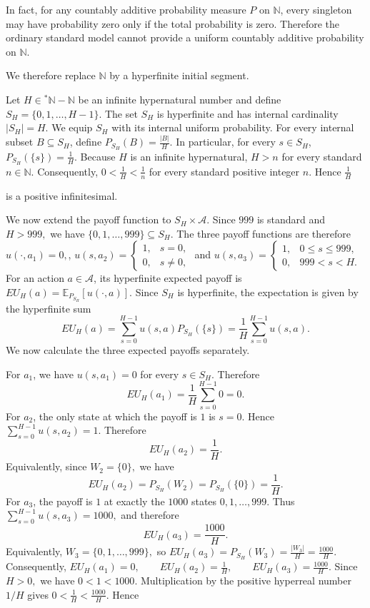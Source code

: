 \documentclass[10pt,a4paper]{book}
\begin{document}
In fact, for any countably additive probability measure $P$ on $\mathbb N$, every singleton may have probability zero only if the total probability is zero. Therefore the ordinary standard model cannot provide a uniform countably additive probability on $\mathbb N$.

We therefore replace $\mathbb N$ by a hyperfinite initial segment.

Let
$
    H\in{}^*\mathbb N-\mathbb N
$
be an infinite hypernatural number and define
$
    S_H=\{0,1,\ldots,H-1\}.
$
The set $S_H$ is hyperfinite and has internal cardinality
$
    |S_H|=H.
$
We equip $S_H$ with its internal uniform probability. For every internal subset $B\subseteq S_H$, define
$
    P_{S_H}(B)=\frac{|B|}{H}.
$
In particular, for every $s\in S_H$,
$
    P_{S_H}(\{s\})
    =
    \frac{1}{H}.
$
Because $H$ is an infinite hypernatural,
$
    H>n
$
for every standard $n\in\mathbb N$. Consequently,
$
    0<\frac1H<\frac1n
$
for every standard positive integer $n$. Hence
$
    \frac1H
$

is a positive infinitesimal.

We now extend the payoff function to $S_H\times\mathcal A$. Since $999$ is standard and
$
    H>999,
$
we have
$
    \{0,1,\ldots,999\}\subseteq S_H.
$
The three payoff functions are therefore
$
    u(\cdot,a_1)=0,
$,
$
    u(s,a_2)=
    \begin{cases}
        1, & s=0,    \\
        0, & s\neq0,
    \end{cases}
$
and
$
    u(s,a_3)=
    \begin{cases}
        1, & 0\leq s\leq999, \\
        0, & 999<s<H.
    \end{cases}
$
For an action $a\in\mathcal A$, its hyperfinite expected payoff is
$
    EU_H(a)
    =
    \mathbb E_{P_{S_H}}[u(\cdot,a)].
$
Since $S_H$ is hyperfinite, the expectation is given by the hyperfinite sum
$$
    EU_H(a)
    =
    \sum_{s=0}^{H-1}u(s,a)P_{S_H}(\{s\})
    =
    \frac1H\sum_{s=0}^{H-1}u(s,a).
$$
We now calculate the three expected payoffs separately.

For $a_1$, we have
$
    u(s,a_1)=0
$
for every $s\in S_H$. Therefore
$$
    EU_H(a_1)
    =
    \frac1H\sum_{s=0}^{H-1}0
    =
    0.
$$
For $a_2$, the only state at which the payoff is $1$ is $s=0$. Hence
$
    \sum_{s=0}^{H-1}u(s,a_2)=1.
$
Therefore
$$
    EU_H(a_2)
    =
    \frac1H.
$$
Equivalently, since
$
    W_2=\{0\},
$
we have
$$
    EU_H(a_2)
    =
    P_{S_H}(W_2)
    =
    P_{S_H}(\{0\})
    =
    \frac1H.
$$
For $a_3$, the payoff is $1$ at exactly the $1000$ states
$
    0,1,\ldots,999.
$
Thus
$
    \sum_{s=0}^{H-1}u(s,a_3)
    =
    1000,
$
and therefore
$$
    EU_H(a_3)
    =
    \frac{1000}{H}.
$$
Equivalently,
$
    W_3=\{0,1,\ldots,999\},
$
so
$
    EU_H(a_3)
    =
    P_{S_H}(W_3)
    =
    \frac{|W_3|}{H}
    =
    \frac{1000}{H}.
$
Consequently,
$
    EU_H(a_1)=0,
    \qquad
    EU_H(a_2)=\frac1H,
    \qquad
    EU_H(a_3)=\frac{1000}{H}.
$
Since $  H>0, $ we have $  0<1<1000. $
Multiplication by the positive hyperreal number $1/H$ gives
$
    0<\frac1H<\frac{1000}{H}.
$
Hence
\end{document}
